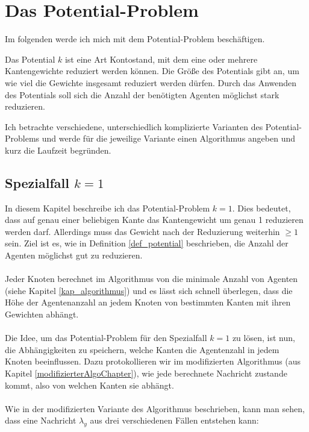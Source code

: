 \section{Das Potential-Problem}

Im folgenden werde ich mich mit dem Potential-Problem beschäftigen.

\begin{mydef}\label{def_potential}
	Das Potential $k$ ist eine Art Kontostand, mit dem eine oder mehrere Kantengewichte reduziert werden können. Die Größe des Potentials gibt an, um wie viel die Gewichte insgesamt reduziert werden dürfen. Durch das Anwenden des Potentials soll sich die Anzahl der benötigten Agenten möglichst stark reduzieren.
\end{mydef}

Ich betrachte verschiedene, unterschiedlich komplizierte Varianten des Potential-Problems und werde für die jeweilige Variante einen Algorithmus angeben und kurz die Laufzeit begründen.

\subsection{Spezialfall $k = 1$}

In diesem Kapitel beschreibe ich das Potential-Problem $k = 1$. Dies bedeutet, dass auf genau einer beliebigen Kante das Kantengewicht um genau 1 reduzieren werden darf. Allerdings muss das Gewicht nach der Reduzierung  weiterhin $\geq 1$ sein. Ziel ist es, wie in Definition \ref{def_potential} beschrieben, die Anzahl der Agenten möglichst gut zu reduzieren.
\\
\\
Jeder Knoten berechnet im Algorithmus von \cite{cima_paper} die minimale Anzahl von Agenten (siehe Kapitel \ref{kap_algorithmus}) und es lässt sich schnell überlegen, dass die Höhe der Agentenanzahl an jedem Knoten von bestimmten Kanten mit ihren Gewichten abhängt.
\\
\\
Die Idee, um das Potential-Problem für den Spezialfall $k = 1$ zu lösen, ist nun, die Abhängigkeiten zu speichern, welche Kanten die Agentenzahl in jedem Knoten beeinflussen. Dazu protokollieren wir im modifizierten Algorithmus (aus Kapitel \ref{modifizierterAlgoChapter}), wie jede berechnete Nachricht zustande kommt, also von welchen Kanten sie abhängt.
\\
\\ 
Wie in der modifizierten Variante des Algorithmus beschrieben, kann man sehen, dass eine Nachricht $\lambda_{y}$ aus drei verschiedenen Fällen entstehen kann:

